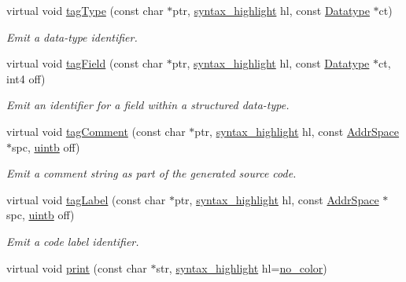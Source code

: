 \begin{DoxyCompactItemize}
virtual void \mbox{\hyperlink{class_emit_no_xml_a9060c9d3fb766c230300186f8eb9b6e6}{tag\+Type}} (const char $\ast$ptr, \mbox{\hyperlink{class_emit_xml_a7c3577436da429c3c75f4b82cac6864f}{syntax\+\_\+highlight}} hl, const \mbox{\hyperlink{class_datatype}{Datatype}} $\ast$ct)
\begin{DoxyCompactList}\small\item\em Emit a data-\/type identifier. \end{DoxyCompactList}\item 
virtual void \mbox{\hyperlink{class_emit_no_xml_aa7afe6c48fea19d04d718305d909716f}{tag\+Field}} (const char $\ast$ptr, \mbox{\hyperlink{class_emit_xml_a7c3577436da429c3c75f4b82cac6864f}{syntax\+\_\+highlight}} hl, const \mbox{\hyperlink{class_datatype}{Datatype}} $\ast$ct, int4 off)
\begin{DoxyCompactList}\small\item\em Emit an identifier for a field within a structured data-\/type. \end{DoxyCompactList}\item 
virtual void \mbox{\hyperlink{class_emit_no_xml_a740eebfd037ace753caa1b98d23f3899}{tag\+Comment}} (const char $\ast$ptr, \mbox{\hyperlink{class_emit_xml_a7c3577436da429c3c75f4b82cac6864f}{syntax\+\_\+highlight}} hl, const \mbox{\hyperlink{class_addr_space}{Addr\+Space}} $\ast$spc, \mbox{\hyperlink{types_8h_a2db313c5d32a12b01d26ac9b3bca178f}{uintb}} off)
\begin{DoxyCompactList}\small\item\em Emit a comment string as part of the generated source code. \end{DoxyCompactList}\item 
virtual void \mbox{\hyperlink{class_emit_no_xml_a9284368eb73de667624814d4d879dfa9}{tag\+Label}} (const char $\ast$ptr, \mbox{\hyperlink{class_emit_xml_a7c3577436da429c3c75f4b82cac6864f}{syntax\+\_\+highlight}} hl, const \mbox{\hyperlink{class_addr_space}{Addr\+Space}} $\ast$spc, \mbox{\hyperlink{types_8h_a2db313c5d32a12b01d26ac9b3bca178f}{uintb}} off)
\begin{DoxyCompactList}\small\item\em Emit a code label identifier. \end{DoxyCompactList}\item 
virtual void \mbox{\hyperlink{class_emit_no_xml_a86cb933b199d3d3cd8823087c1fc1404}{print}} (const char $\ast$str, \mbox{\hyperlink{class_emit_xml_a7c3577436da429c3c75f4b82cac6864f}{syntax\+\_\+highlight}} hl=\mbox{\hyperlink{class_emit_xml_a7c3577436da429c3c75f4b82cac6864facf637f33b975ebd31bda638a66d5b052}{no\+\_\+color}})

\end{DoxyCompactItemize}
